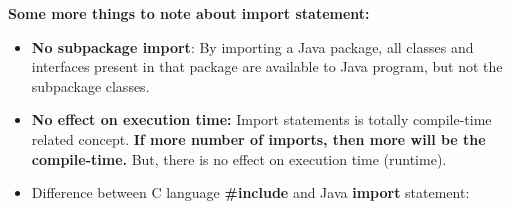 \begin{flushleft}
		
		
			
		\newpage
		
		\textbf{Some more things to note about import statement:}
		\begin{itemize}
			\item \textbf{No subpackage import}: By importing a Java package, all classes and interfaces present in that package are available to Java program, but not the subpackage classes.
			\bigskip
			\item \textbf{No effect on execution time:} Import statements is totally compile-time 
			related concept. \textbf{If more number of imports, then more will be the compile-time.} But, there is no effect on execution time (runtime).
			\bigskip
			\item Difference between C language \textbf{#include} and Java \textbf{import} statement:
			\bigskip
			\bigskip
		\end{itemize}
		
		
		
		
		

		
		
		
				

	
\end{flushleft}

\newpage

